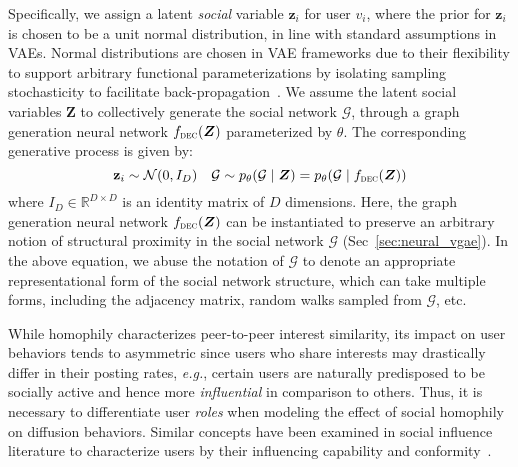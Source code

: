 \documentclass[sigconf]{acmart}
\def\rvz{{\mathbf{z}}}
\def\mZ{{\bm{Z}}}
\def\gG{{\mathcal{G}}}
\def\gN{{\mathcal{N}}}
\def\sR{{\mathbb{R}}}
\begin{document}
Specifically, we assign a latent \emph{social} variable $\rvz_i$ for user $v_i$, where the prior for $\rvz_i$ is chosen to be a unit normal distribution, in line with standard assumptions in VAEs.
Normal distributions are chosen in VAE frameworks due to their flexibility to support arbitrary functional parameterizations by isolating sampling stochasticity to facilitate back-propagation~\cite{vae}.
We assume the latent social variables $\mZ$ to collectively generate the social network $\gG$, through a graph generation neural network $f_{\textsc{dec}} (\mZ)$ parameterized by $\theta$. The corresponding generative process is given by:
\begin{equation}
\rvz_i \sim \gN (0, I_D) \hspace{10pt} \gG \sim p_{\theta}(\gG \mid \mZ) =  p_{\theta}(\gG \mid  f_{\textsc{dec}} (\mZ))
\label{eqn:struct_gen}
\end{equation}
where $I_D \in \sR^{D \times D}$ is an identity matrix of $D$ dimensions. Here, the graph generation neural network $f_{\textsc{dec}} (\mZ)$ can be instantiated to preserve an arbitrary notion of structural proximity in the social network $\gG$ (Sec~\ref{sec:neural_vgae}).
In the above equation, we abuse the notation of $\gG$ to denote an appropriate representational form of the social network structure, which can take multiple forms, including the adjacency matrix, random walks sampled from $\gG$, etc.

While homophily characterizes peer-to-peer interest similarity, its impact on user behaviors tends to asymmetric since users who share interests may drastically differ in their posting rates, \textit{e.g.}, certain users are naturally predisposed to be socially active and hence more \textit{influential} in comparison to others.
Thus, it is necessary to differentiate user \textit{roles} when modeling the effect of social homophily on diffusion behaviors.
Similar concepts have been examined in social influence literature to characterize users by their influencing capability and conformity~\cite{conformity,aaai15,wsdm16,topolstm,inf2vec}.
\end{document}
